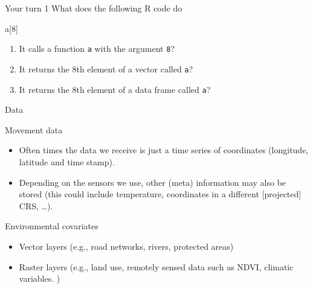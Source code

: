 \documentclass[ignorenonframetext,,t]{beamer}
\providecommand{\tightlist}{%
\setlength{\itemsep}{0pt}\setlength{\parskip}{0pt}}
\newenvironment{Shaded}{\begin{snugshade}}{\end{snugshade}}
\newcommand{\DecValTok}[1]{\textcolor[rgb]{0.00,0.00,0.81}{#1}}
\newcommand{\NormalTok}[1]{#1}
\providecommand{\tightlist}{%
\setlength{\itemsep}{0pt}\setlength{\parskip}{0pt}}
\renewcommand{\tightlist}{\setlength{\itemsep}{1.4ex}\setlength{\parskip}{0pt}}
\begin{document}
\begin{frame}[fragile]{Your turn 1}
\protect\hypertarget{your-turn-1}{}
What does the following R code do

\begin{Shaded}
\begin{Highlighting}[]
\NormalTok{a[}\DecValTok{8}\NormalTok{]}
\end{Highlighting}
\end{Shaded}

\begin{enumerate}
\tightlist
\item
  It calls a function \texttt{a} with the argument \texttt{8}?
\item
  It returns the 8th element of a vector called \texttt{a}?
\item
  It returns the 8th element of a data frame called \texttt{a}?
\end{enumerate}
\end{frame}

\begin{frame}{Data}
\protect\hypertarget{data}{}
\begin{block}{Movement data}
\protect\hypertarget{movement-data}{}
\begin{itemize}
\tightlist
\item
  Often times the data we receive is just a time series of coordinates
  (longitude, latitude and time stamp).
\item
  Depending on the sensors we use, other (meta) information may also be
  stored (this could include temperature, coordinates in a different
  {[}projected{]} CRS, \ldots).
\end{itemize}
\end{block}
\end{frame}

\begin{frame}
\begin{block}{Environmental covariates}
\protect\hypertarget{environmental-covariates}{}
\begin{itemize}
\tightlist
\item
  Vector layers (e.g., road networks, rivers, protected areas)
\item
  Raster layers (e.g., land use, remotely sensed data such as NDVI,
  climatic variables. )
\end{itemize}
\end{block}
\end{frame}
\end{document}
